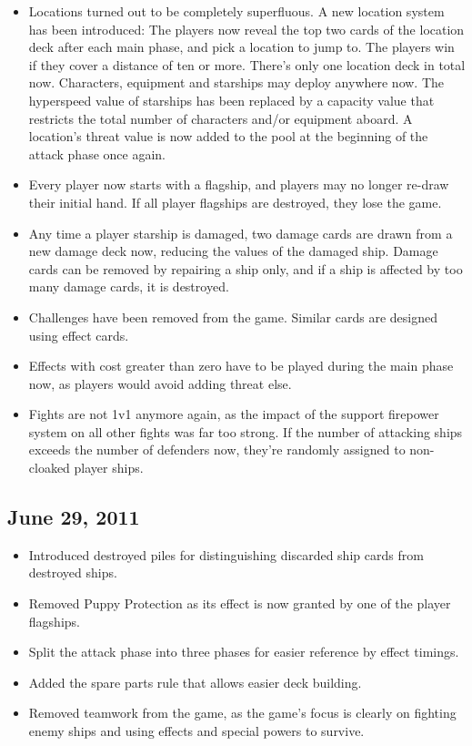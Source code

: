 \documentclass[11pt, a4paper]{article}
\begin{document}
\begin{itemize}
 \item Locations turned out to be completely superfluous. A new location system
has been introduced: The players now reveal the top two cards of the location
deck after each main phase, and pick a location to jump to. The players win
if they cover a distance of ten or more. There's only one location deck in
total now. Characters, equipment and starships may deploy anywhere now. The
hyperspeed value of starships has been replaced by a capacity value that
restricts the total number of characters and/or equipment aboard. A location's
threat value is now added to the pool at the beginning of the attack phase
once again.
 \item Every player now starts with a flagship, and players may no longer
re-draw their initial hand. If all player flagships are destroyed, they lose
the game.
 \item Any time a player starship is damaged, two damage cards are drawn from
a new damage deck now, reducing the values of the damaged ship. Damage cards
can be removed by repairing a ship only, and if a ship is affected by too many
damage cards, it is destroyed.
 \item Challenges have been removed from the game. Similar cards are designed
using effect cards.
 \item Effects with cost greater than zero have to be played during the main
phase now, as players would avoid adding threat else.
 \item Fights are not 1v1 anymore again, as the impact of the support firepower
system on all other fights was far too strong. If the number of attacking
ships exceeds the number of defenders now, they're randomly assigned to
non-cloaked player ships.
\end{itemize}

\subsection{June 29, 2011}

\begin{itemize}
 \item Introduced destroyed piles for distinguishing discarded ship
cards from destroyed ships.
 \item Removed Puppy Protection as its effect is now granted by one of the
player flagships.
 \item Split the attack phase into three phases for easier reference by effect
timings.
 \item Added the spare parts rule that allows easier deck building.
 \item Removed teamwork from the game, as the game's focus is clearly on
fighting enemy ships and using effects and special powers to survive.
\end{itemize}
\end{document}
